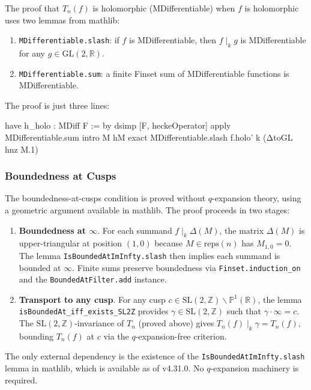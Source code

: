 \documentclass[11pt]{article}
\theoremstyle{plain}
\theoremstyle{definition}
\theoremstyle{remark}
\begin{document}
The proof that $T_n(f)$ is holomorphic (MDifferentiable) when $f$ is holomorphic uses two lemmas from mathlib:

\begin{enumerate}
  \item \texttt{MDifferentiable.slash}: if $f$ is MDifferentiable, then $f\mid_k g$ is MDifferentiable for any $g\in\mathrm{GL}(2,\mathbb{R})$.
  \item \texttt{MDifferentiable.sum}: a finite Finset sum of MDifferentiable functions is MDifferentiable.
\end{enumerate}

The proof is just three lines:

\begin{lean}
have h_holo : MDiff F := by
  dsimp [F, heckeOperator]
  apply MDifferentiable.sum
  intro M hM
  exact MDifferentiable.slash f.holo' k (ΔtoGL hnz M.1)
\end{lean}

\subsubsection{Boundedness at Cusps}

The boundedness-at-cusps condition is proved without $q$-expansion theory, using a geometric argument available in mathlib.
The proof proceeds in two stages:

\begin{enumerate}
  \item \textbf{Boundedness at $\infty$}. For each summand $f\mid_k\Delta(M)$, the matrix $\Delta(M)$ is upper-triangular at position $(1,0)$ because $M\in\mathrm{reps}(n)$ has $M_{1,0}=0$. The lemma \texttt{IsBoundedAtImInfty.slash} then implies each summand is bounded at $\infty$. Finite sums preserve boundedness via \texttt{Finset.induction\_on} and the \texttt{BoundedAtFilter.add} instance.
  \item \textbf{Transport to any cusp}. For any cusp $c\in\mathrm{SL}(2,\mathbb{Z})\backslash\mathbb{P}^1(\mathbb{R})$, the lemma \texttt{isBoundedAt\_iff\_exists\_SL2Z} provides $\gamma\in\mathrm{SL}(2,\mathbb{Z})$ such that $\gamma\cdot\infty = c$. The $\mathrm{SL}(2,\mathbb{Z})$-invariance of $T_n$ (proved above) gives $T_n(f)\mid_k\gamma = T_n(f)$, bounding $T_n(f)$ at $c$ via the $q$-expansion-free criterion.
\end{enumerate}

The only external dependency is the existence of the \texttt{IsBoundedAtImInfty.slash} lemma in mathlib, which is available as of v4.31.0. No $q$-expansion machinery is required.
\end{document}
